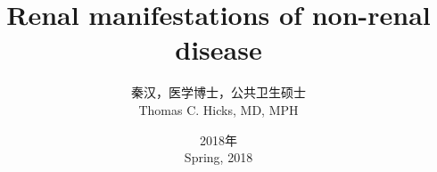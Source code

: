 \documentclass{beamer}
\begin{document}
\begin{CJK*}{UTF8}{gbsn}

	\title{Renal manifestations of non-renal disease}
	\author[秦汉]{秦汉，医学博士，公共卫生硕士\\ Thomas C. Hicks, MD, MPH}
	\date{2018年\\Spring, 2018}

\begin{frame}
	\titlepage
\end{frame}




\end{CJK*}
\end{document}

